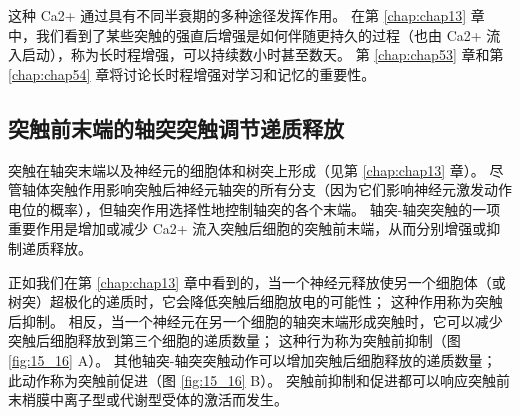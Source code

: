 这种 Ca2+ 通过具有不同半衰期的多种途径发挥作用。 
在第 \ref{chap:chap13} 章中，我们看到了某些突触的强直后增强是如何伴随更持久的过程（也由 Ca2+ 流入启动），称为长时程增强，可以持续数小时甚至数天。 
第 \ref{chap:chap53} 章和第 \ref{chap:chap54} 章将讨论长时程增强对学习和记忆的重要性。


\subsection{突触前末端的轴突突触调节递质释放}
突触在轴突末端以及神经元的细胞体和树突上形成（见第 \ref{chap:chap13} 章）。 
尽管轴体突触作用影响突触后神经元轴突的所有分支（因为它们影响神经元激发动作电位的概率），但轴突作用选择性地控制轴突的各个末端。 
轴突-轴突突触的一项重要作用是增加或减少 Ca2+ 流入突触后细胞的突触前末端，从而分别增强或抑制递质释放。


正如我们在第 \ref{chap:chap13} 章中看到的，当一个神经元释放使另一个细胞体（或树突）超极化的递质时，它会降低突触后细胞放电的可能性； 这种作用称为突触后抑制。 
相反，当一个神经元在另一个细胞的轴突末端形成突触时，它可以减少突触后细胞释放到第三个细胞的递质数量； 这种行为称为突触前抑制（图 \ref{fig:15_16} A）。 
其他轴突-轴突突触动作可以增加突触后细胞释放的递质数量； 此动作称为突触前促进（图 \ref{fig:15_16} B）。 
突触前抑制和促进都可以响应突触前末梢膜中离子型或代谢型受体的激活而发生。

